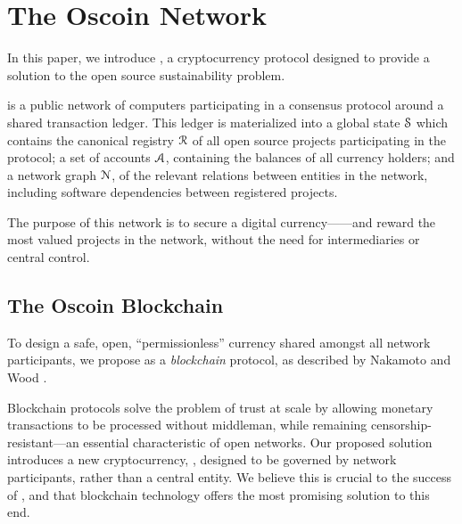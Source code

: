 \section{The Oscoin Network}
\label{s:oscoin}

\noindent In this paper, we introduce \oscoin{}, a cryptocurrency protocol
designed to provide a solution to the open source sustainability problem.

\Oscoin{} is a public network of computers participating in a consensus
protocol around a shared transaction ledger.
This ledger is materialized into a global state $\mathcal{S}$ which
contains the canonical registry $\mathcal{R}$ of all open source
projects participating in the protocol; a set of accounts
$\mathcal{A}$, containing the balances of all currency holders; and
a network graph $\mathcal{N}$, of the relevant relations between
entities in the network, including software dependencies between registered projects.

The purpose of this network is to secure a digital currency---\oscoin{}---and
reward the most valued projects in the network, without the need
for intermediaries or central control.

\subsection{The Oscoin Blockchain}

To design a safe, open, ``permissionless'' currency shared amongst all network
participants, we propose \oscoin{} as a \emph{blockchain} protocol, as
described by Nakamoto \cite{bitcoin} and Wood \cite{ethereum}.

Blockchain protocols solve the problem of trust at scale by allowing monetary
transactions to be processed without middleman, while remaining
censorship-resistant---an essential characteristic of open networks.  Our
proposed solution introduces a new cryptocurrency, \oscoin{}, designed to be
governed by network participants, rather than a central entity. We believe this is
crucial to the success of \oscoin{}, and that blockchain technology offers the
most promising solution to this end.

